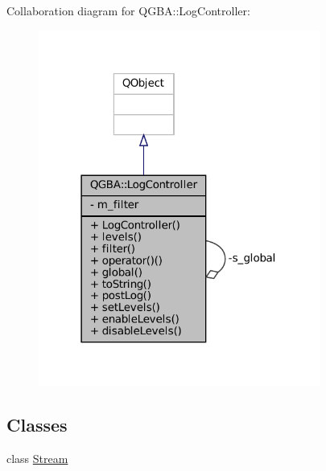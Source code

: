 Collaboration diagram for Q\+G\+BA\+:\+:Log\+Controller\+:
\nopagebreak
\begin{figure}[H]
\begin{center}
\leavevmode
\includegraphics[width=262pt]{class_q_g_b_a_1_1_log_controller__coll__graph}
\end{center}
\end{figure}
\subsection*{Classes}
\begin{DoxyCompactItemize}
\item 
class \mbox{\hyperlink{class_q_g_b_a_1_1_log_controller_1_1_stream}{Stream}}
\end{DoxyCompactItemize}
